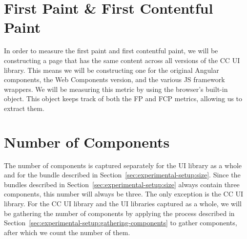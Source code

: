 \section{First Paint \& First Contentful Paint}
In order to measure the first paint and first contentful paint, we will be constructing a page that has the same content across all versions of the CC UI library. This means we will be constructing one for the original Angular components, the Web Components version, and the various JS framework wrappers. We will be measuring this metric by using the browser's built-in  object. This object keeps track of both the FP and FCP metrics, allowing us to extract them.

\section{Number of Components}
The number of components is captured separately for the UI library as a whole and for the bundle described in Section~\ref{sec:experimental-setup:size}. Since the bundles described in Section~\ref{sec:experimental-setup:size} always contain three components, this number will always be three. The only exception is the CC UI library. For the CC UI library and the UI libraries captured as a whole, we will be gathering the number of components by applying the process described in Section~\ref{sec:experimental-setup:gathering-components} to gather components, after which we count the number of them.